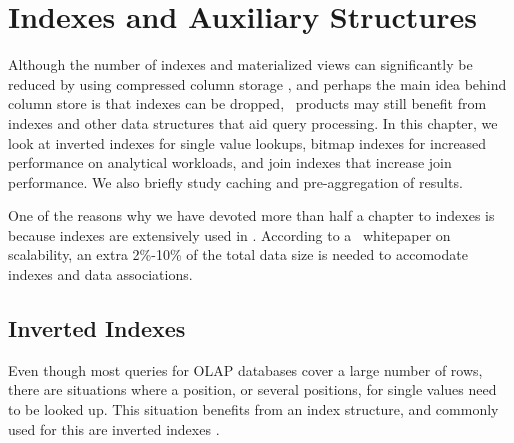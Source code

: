\chapter{Indexes and Auxiliary Structures}
\label{chap:Indexes and Auxiliary Structures}

Although the number of indexes and materialized views can significantly be reduced by using compressed column storage \cite{Lahiri2015-mz}, and perhaps the main idea behind column store is that indexes can be dropped, \bd~products may still benefit from indexes and other data structures that aid query processing. In this chapter, we look at inverted indexes for single value lookups, bitmap indexes for increased performance on analytical workloads, and join indexes that increase join performance. We also briefly study caching and pre-aggregation of results.

One of the reasons why we have devoted more than half a chapter to indexes is because indexes are extensively used in \qlikview. According to a \qlikview~whitepaper on scalability, an extra 2\%-10\% of the total data size is needed to accomodate indexes and data associations.

\newpage

\section{Inverted Indexes}
\label{sec:Inverted Indexes}



Even though most queries for OLAP databases cover a large number of rows, there are situations where a position, or several positions, for single values need to be looked up. This situation benefits from an index structure, and commonly used for this are inverted indexes \cite{Lemke2010-is}. 

